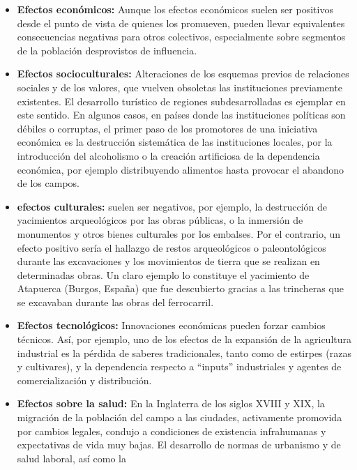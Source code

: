 \begin{itemize}
	\item \textbf{Efectos económicos:} Aunque los efectos económicos suelen ser positivos desde el
	      punto de vista de quienes los promueven, pueden llevar equivalentes
	      consecuencias negativas para otros colectivos, especialmente sobre segmentos de
	      la población desprovistos de influencia.
	\item \textbf{Efectos socioculturales:} Alteraciones de los esquemas previos de relaciones
	      sociales y de los valores, que vuelven obsoletas las instituciones previamente
	      existentes. El desarrollo turístico de regiones subdesarrolladas es ejemplar en este
	      sentido. En algunos casos, en países donde las instituciones políticas son débiles o
	      corruptas, el primer paso de los promotores de una iniciativa económica es la
	      destrucción sistemática de las instituciones locales, por la introducción del
	      alcoholismo o la creación artificiosa de la dependencia económica, por ejemplo
	      distribuyendo alimentos hasta provocar el abandono de los campos.
	\item \textbf{efectos culturales:} suelen ser negativos, por ejemplo, la destrucción
	      de yacimientos arqueológicos por las obras públicas, o la inmersión de
	      monumentos y otros bienes culturales por los embalses. Por el contrario, un efecto
	      positivo sería el hallazgo de restos arqueológicos o paleontológicos durante las
	      excavaciones y los movimientos de tierra que se realizan en determinadas obras.
	      Un claro ejemplo lo constituye el yacimiento de Atapuerca (Burgos, España) que fue
	      descubierto gracias a las trincheras que se excavaban durante las obras del
	      ferrocarril.
	\item \textbf{Efectos tecnológicos:} Innovaciones económicas pueden forzar cambios técnicos.
	      Así, por ejemplo, uno de los efectos de la expansión de la agricultura industrial es la
	      pérdida de saberes tradicionales, tanto como de estirpes (razas y cultivares), y la
	      dependencia respecto a ``inputs'' industriales y agentes de comercialización y
	      distribución.
	\item \textbf{Efectos sobre la salud:} En la Inglaterra de los siglos XVIII y XIX, la migración de la
	      población del campo a las ciudades, activamente promovida por cambios legales,
	      condujo a condiciones de existencia infrahumanas y expectativas de vida muy
	      bajas. El desarrollo de normas de urbanismo y de salud laboral, así como la

\end{itemize}

